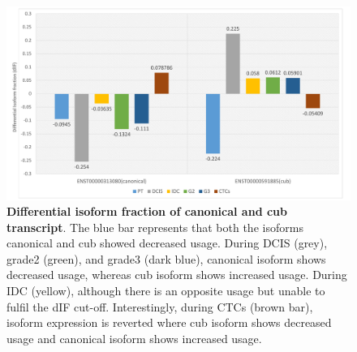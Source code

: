 \documentclass[fleqn,10pt,lineno]{wlpeerj}
\begin{document}
\begin{figure}[ht] %
\centering
\captionsetup{justification=centering}
\vspace{.5cm} %
\begin{flushright}
\includegraphics[width=150mm]{Figure2.pdf}
\caption{
\textbf{Differential isoform fraction of canonical and cub transcript}. 
The blue bar represents that both the isoforms canonical and cub showed decreased usage. During DCIS (grey), grade2 (green), and grade3 (dark blue), canonical isoform shows decreased usage, whereas cub isoform shows increased usage. During IDC (yellow), although there is an opposite usage but unable to fulfil the dIF cut-off. Interestingly, during CTCs (brown bar), isoform expression is reverted where cub isoform shows decreased usage and canonical isoform shows increased usage.}
\label{fig2}
\end{flushright}
\end{figure}
\end{document}
